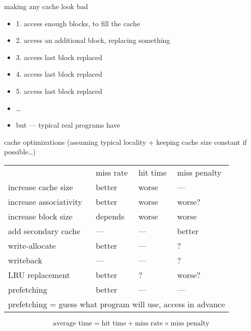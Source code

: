 \begin{frame}{making any cache look bad}
    \begin{itemize}
    \item 1. access enough blocks, to fill the cache
    \item 2. access an additional block, replacing something
    \item 3. access last block replaced
    \item 4. access last block replaced
    \item 5. access last block replaced
    \item \ldots
        \vspace{.5cm}
    \item but --- typical real programs have 
    \end{itemize}
\end{frame}

\begin{frame}{cache optimizations}
(assuming typical locality + keeping cache size constant if possible\ldots)
\newcommand{\good}{\textcolor{green!50!black}{better}}
\newcommand{\bad}{\textcolor{red!50!black}{worse}}
\begin{tabular}{llll}
~ & miss rate & hit time & miss penalty \\
increase cache size & \good & \bad & --- \\
increase associativity & \good & \bad & \bad? \\
increase block size & depends & \bad & \bad \\
add secondary cache & --- & --- & \good \\
write-allocate & \good & --- & ? \\
writeback & --- & --- & ? \\
LRU replacement & \good & ? & \bad? \\
prefetching & \good & --- & --- \\
\multicolumn{4}{l}{\small prefetching = guess what program will use, access in advance}
\end{tabular}
\[
\text{average time} = \text{hit time} + \text{miss rate} \times \text{miss penalty}
\]
\end{frame}


